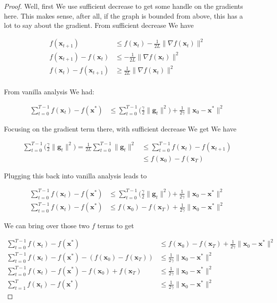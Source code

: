 \documentclass{article}
\begin{document}
	\begin{proof}
		Well, first We use sufficient decrease to get some handle on the gradients here. This makes sense, after all, if the graph is bounded from above, this has a lot to say about the gradient. From sufficient decrease We have 
		
		\begin{align*}
			f(\mathbf{x}_{t+1}) &\le f(\mathbf{x}_t) -\frac{1}{2L}\| \nabla f(\mathbf{x}_t) \|^2\\
			f(\mathbf{x}_{t+1}) - f(\mathbf{x}_t) &\le  -\frac{1}{2L}\| \nabla f(\mathbf{x}_t) \|^2\\
			f(\mathbf{x}_t) - f(\mathbf{x}_{t+1})  &\ge  \frac{1}{2L}\| \nabla f(\mathbf{x}_t) \|^2\\
		\end{align*}
		
		From vanilla analysis We had:
		
		\begin{align*}
			\sum^{T-1}_{t=0}f(\mathbf{x}_t) - f(\mathbf{x}^*) &\le \sum^{T-1}_{t=0} \bigg(  \frac{\gamma}{2} \|\mathbf{g}_t\|^2\bigg) + \frac{1}{2\gamma} \|\mathbf{x}_0 - \mathbf{x}^*\|^2
		\end{align*}
		
		Focusing on the gradient term there, with sufficient decrease We get We have
		
		\begin{align*}
			\sum^{T-1}_{t=0} \bigg(  \frac{\gamma}{2} \|\mathbf{g}_t\|^2\bigg) = \frac{1}{2L}\sum^{T-1}_{t=0}   \|\mathbf{g}_t\|^2 &\le \sum^{T-1}_{t=0} f(\mathbf{x}_t) - f(\mathbf{x}_{t+1})\\
			&\le  f(\mathbf{x}_0) - f(\mathbf{x}_{T})
		\end{align*}
		
		Plugging  this back into vanilla analysis leads to 
		
		\begin{align*}
			\sum^{T-1}_{t=0}f(\mathbf{x}_t) - f(\mathbf{x}^*) &\le \sum^{T-1}_{t=0} \bigg(  \frac{\gamma}{2} \|\mathbf{g}_t\|^2\bigg) + \frac{1}{2\gamma} \|\mathbf{x}_0 - \mathbf{x}^*\|^2\\
			\sum^{T-1}_{t=0}f(\mathbf{x}_t) - f(\mathbf{x}^*) &\le f(\mathbf{x}_0) - f(\mathbf{x}_{T}) + \frac{1}{2\gamma} \|\mathbf{x}_0 - \mathbf{x}^*\|^2
		\end{align*}
		
		We can bring over those two $f$ terms to get 
		
		\begin{align*}
			\sum^{T-1}_{t=0}f(\mathbf{x}_t) - f(\mathbf{x}^*) &\le f(\mathbf{x}_0) - f(\mathbf{x}_{T}) + \frac{1}{2\gamma} \|\mathbf{x}_0 - \mathbf{x}^*\|^2\\
			\sum^{T-1}_{t=0}f(\mathbf{x}_t) - f(\mathbf{x}^*) - (f(\mathbf{x}_0) - f(\mathbf{x}_{T})) &\le  \frac{1}{2\gamma} \|\mathbf{x}_0 - \mathbf{x}^*\|^2\\
			\sum^{T-1}_{t=0}f(\mathbf{x}_t) - f(\mathbf{x}^*) - f(\mathbf{x}_0) + f(\mathbf{x}_{T}) &\le  \frac{1}{2\gamma} \|\mathbf{x}_0 - \mathbf{x}^*\|^2 \\
			\sum^{T}_{t=1}f(\mathbf{x}_t) - f(\mathbf{x}^*)  &\le  \frac{1}{2\gamma} \|\mathbf{x}_0 - \mathbf{x}^*\|^2
		\end{align*}
		

\end{proof}
\end{document}
